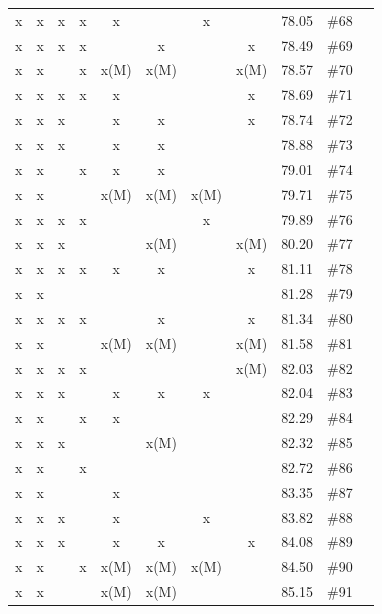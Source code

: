 \begin{table}[H]
{\begin{tabular}{c c c c c c c c c c c}
 x    & x    & x    & x    & x    &      & x    &      & 78.05 & \#68 \\
 x    & x    & x    & x    &      & x    &      & x    & 78.49 & \#69 \\
 x    & x    &      & x    & x(M) & x(M) &      & x(M) & 78.57 & \#70 \\
 x    & x    & x    & x    & x    &      &      & x    & 78.69 & \#71 \\
 x    & x    & x    &      & x    & x    &      & x    & 78.74 & \#72 \\
 x    & x    & x    &      & x    & x    &      &      & 78.88 & \#73 \\
 x    & x    &      & x    & x    & x    &      &      & 79.01 & \#74 \\
 x    & x    &      &      & x(M) & x(M) & x(M) &      & 79.71 & \#75 \\
 x    & x    & x    & x    &      &      & x    &      & 79.89 & \#76 \\
 x    & x    & x    &      &      & x(M) &      & x(M) & 80.20 & \#77 \\
 x    & x    & x    & x    & x    & x    &      & x    & 81.11 & \#78 \\
 x    & x    &      &      &      &      &      &      & 81.28 & \#79 \\
 x    & x    & x    & x    &      & x    &      & x    & 81.34 & \#80 \\
 x    & x    &      &      & x(M) & x(M) &      & x(M) & 81.58 & \#81 \\
 x    & x    & x    & x    &      &      &      & x(M) & 82.03 & \#82 \\
 x    & x    & x    &      & x    & x    & x    &      & 82.04 & \#83 \\
 x    & x    &      & x    & x    &      &      &      & 82.29 & \#84 \\
 x    & x    & x    &      &      & x(M) &      &      & 82.32 & \#85 \\
 x    & x    &      & x    &      &      &      &      & 82.72 & \#86 \\
 x    & x    &      &      & x    &      &      &      & 83.35 & \#87 \\
 x    & x    & x    &      & x    &      & x    &      & 83.82 & \#88 \\
 x    & x    & x    &      & x    & x    &      & x    & 84.08 & \#89 \\
 x    & x    &      & x    & x(M) & x(M) & x(M) &      & 84.50 & \#90 \\
 x    & x    &      &      & x(M) & x(M) &      &      & 85.15 & \#91 \\

\end{tabular}}
\end{table}
